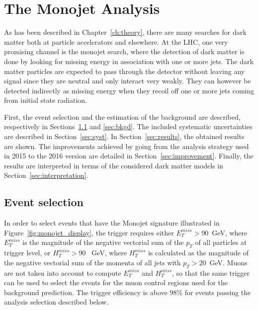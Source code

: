\graphicspath{{chapt_dutch/}{intro/}{monojet/}}

\renewcommand\evenpagerightmark{{\scshape\small Chapter 5}}
\renewcommand\oddpageleftmark{{\scshape\small The Monojet Analysis}}

\hyphenation{}

\chapter{The Monojet Analysis}
\label{ch:monojet}

As has been described in Chapter~\ref{ch:theory}, there are many searches for dark matter both at 
particle accelerators and elsewhere. At the \ac{LHC}, one very promising channel is the 
monojet search, where the detection of dark matter is done by looking for missing energy in association 
with one or more jets. The dark matter particles are expected to pass through the detector without leaving any signal since they are neutral and only interact very weakly. They can however be detected indirectly as missing energy when they recoil off one or more jets coming from initial state radiation.

First, the event selection and the estimation of the background are described, respectively in Sections~\ref{sec:selection} and \ref{sec:bkgd}. The included systematic uncertainties are described in Section~\ref{sec:syst}. In Section~\ref{sec:results}, the obtained results are shown. The improvements achieved by going from the analysis strategy used in 2015 to the 2016 version are detailed in Section~\ref{sec:improvement}. Finally, the results are interpreted in terms of the considered dark matter models in Section~\ref{sec:interpretation}.


\section{Event selection}
\label{sec:selection}

In order to select events that have the Monojet signature illustrated in Figure~\ref{fig:monojet_display}, the trigger requires either $E_T^{miss} > 90$~GeV, where $E_T^{miss}$ is the magnitude of the negative vectorial sum of the $p_T$ of all particles at trigger level, or $H_T^ {miss} > 90$ ~GeV, where $H_T^{miss}$ is calculated as the magnitude of the negative vectorial sum of the momenta of all jets with $p_T > 20$~GeV. Muons are not taken into account to compute $E_T^{miss}$ and $H_T^{miss}$, so that the same trigger can be used to select the events for the muon control regions used for the background prediction. The trigger efficiency is above 98\% for events passing the analysis selection described below.

